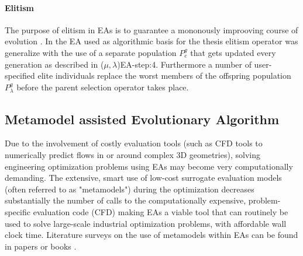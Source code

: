 

\paragraph{Elitism}
The purpose of elitism in EAs is to guarantee a mononously improoving course of evolution \cite{Back1996}. In the EA used as algorithmic basis for the thesis elitism operator was generalize with the use of a separate population $P_e^g$ that gets updated every generation as described in ($\mu,\lambda$)EA-step:4. Furthermore a number of user-specified elite individuals replace the worst members of the offspring population $P^g_{\lambda}$ before the parent selection operator takes place.
  

\subsection{Metamodel assisted Evolutionary Algorithm}

Due to the involvement of costly evaluation tools (such as CFD tools to numerically predict flows in or around complex 3D geometries), solving engineering optimization problems using EAs may become very computationally demanding. The extensive, smart use of low-cost surrogate evaluation models (often referred to as "metamodels") during the optimization decreases substantially the number of calls to the computationally expensive, problem-specific evaluation code (CFD) making EAs a viable tool that can routinely be used to solve large-scale industrial optimization problems, with affordable wall clock time. Literature surveys on the use of metamodels within EAs can be found in papers \cite{LTT_2_020,Jin2002,LTT_2_027} or books \cite{KEANEbook}.



